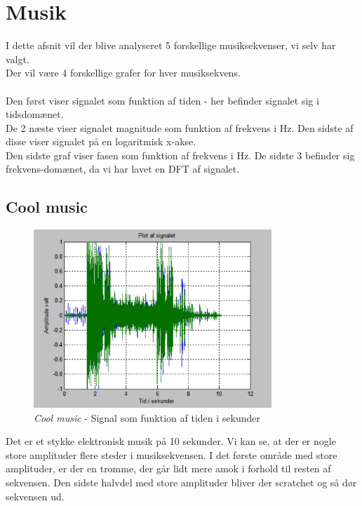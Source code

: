 \chapter{Musik}
I dette afsnit vil der blive analyseret 5 forskellige musiksekvenser, vi selv har valgt. \\
Der vil være 4 forskellige grafer for hver musiksekvens.\\ \\
Den først viser signalet som funktion af tiden - her befinder signalet sig i tidsdomænet. \\
De 2 næste viser signalet magnitude som funktion af frekvens i Hz. Den sidste af disse viser signalet på en logaritmisk x-akse. \\
Den sidste graf viser fasen som funktion af frekvens i Hz. De sidste 3 befinder sig frekvens-domænet, da vi har lavet en DFT af signalet.  

\section{Cool music}

\begin{figure}[H]
	\centering
	\includegraphics[width=0.8\textwidth]{Figurer/Snip20151001_3}
	\caption{\textit{Cool music} - Signal som funktion af tiden i sekunder}
\end{figure}

Det er et stykke elektronisk musik på 10 sekunder. Vi kan se, at der er nogle store amplituder flere steder i musiksekvensen. I det første område med store amplituder, er der en tromme, der går lidt mere amok i forhold til resten af sekvensen. Den sidste halvdel med store amplituder bliver der scratchet og så dør sekvensen ud.

